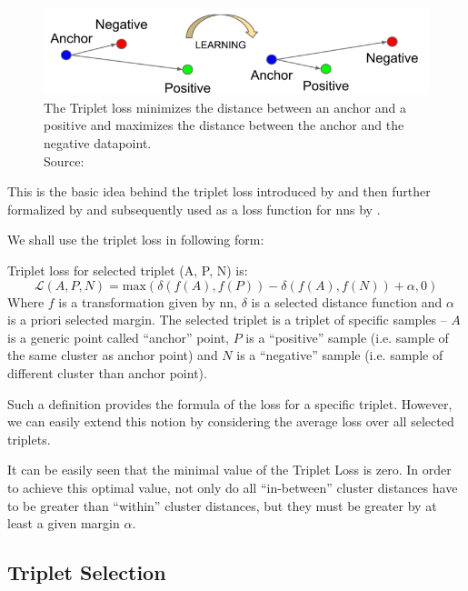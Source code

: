 \begin{figure}
    \centering
    \includegraphics[width=\textwidth]{img/triplet_loss.png}
    \caption[Triplet loss]{The Triplet loss minimizes the distance between an anchor and a positive and maximizes the distance between the anchor and the negative datapoint.\\
    Source: \cite{tripletlossnn}}
    \label{fig:triplet_loss}
\end{figure}

This is the basic idea behind the triplet loss introduced by \cite{tripletlossfirst} and then further formalized by \cite{tripletlosssecond} and subsequently used as a loss function for \glspl{nn} by \cite{tripletlossnn}.

We shall use the triplet loss in following form:
\begin{defn}
Triplet loss for selected triplet (A, P, N) is:
\begin{equation}
\mathcal{L}(A, P, N) = \text{max}(\delta(f(A), f(P)) - \delta(f(A), f(N)) + \alpha, 0)
\label{eq:triplet}
\end{equation}
Where $f$ is a transformation given by \gls{nn}, $\delta$
is a selected distance function and $\alpha$ is a priori selected margin. The
selected triplet is a triplet of specific samples -- $A$ is a generic point
called ``anchor'' point, $P$ is a ``positive'' sample (i.e. sample of the same
cluster as anchor point) and $N$ is a ``negative'' sample (i.e. sample of
different cluster than anchor point).
\end{defn}


Such a definition provides the formula of the loss for a specific triplet. However, we can easily extend this notion by considering the average loss over all selected triplets.

It can be easily seen that the minimal value of the Triplet Loss is zero. In order to achieve this optimal value, not only do all ``in-between'' cluster distances have to be greater than ``within'' cluster distances, but they must be greater by at least a given margin $\alpha$.

\subsection{Triplet Selection}

